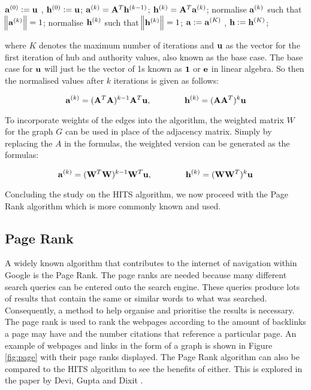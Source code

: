 \begin{algorithmic}
\State $\bold{a}^{(0)} := \bold{u}$ ,   $\bold{h}^{(0)} := \bold{u}$;
   		 \State \qquad $\bold{a}^{(k)} = \bold{A}^{T}\bold{h}^{(k-1)}$;
		 \State \qquad $\bold{h}^{(k)} = \bold{A}^{T}\bold{a}^{(k)}$;
		 \State \qquad normalise $\bold{a}^{(k)}$ such that $\norm{\bold{a}^{(k)}} = 1$;
		 \State \qquad normalise $\bold{h}^{(k)}$ such that $\norm{\bold{h}^{(k)}} = 1$;
\EndFor 
\State $\bold{a} := \bold{a}^{(K)}$ ,   $\bold{h} := \bold{h}^{(K)}$;
\newline
\end{algorithmic}

where $K$ denotes the maximum number of iterations and $\bold{u}$ as the vector for the first iteration of hub and authority values, also known as the base case. The base case for $\bold{u}$ will just be the vector of 1s known as $\bold{1}$ or $\bold{e}$ in linear algebra. So then the normalised values after $k$ iterations is given as follows:

\begin{equation} \label{eq:nhits}
\bold{a}^{(k)} = (\bold{A}^{T}\bold{A})^{k-1}\bold{A}^{T}\bold{u} , \qquad \qquad \bold{h}^{(k)} = (\bold{A}\bold{A}^{T})^{k}\bold{u}
\end{equation}

To incorporate weights of the edges into the algorithm, the weighted matrix $W$ for the graph $G$ can be used in place of the adjacency matrix. Simply by replacing the $A$ in the formulas, the weighted version can be generated as the formulas:

\begin{equation} \label{eq:nhits}
\bold{a}^{(k)} = (\bold{W}^{T}\bold{W})^{k-1}\bold{W}^{T}\bold{u} , \qquad \qquad \bold{h}^{(k)} = (\bold{W}\bold{W}^{T})^{k}\bold{u}
\end{equation}

Concluding the study on the HITS algorithm, we now proceed with the Page Rank algorithm which is more commonly known and used.

\subsection{Page Rank}
A widely known algorithm that contributes to the internet of navigation within Google is the Page Rank. The page ranks are needed because many different search queries can be entered onto the search engine. These queries produce lots of results that contain the same or similar words to what was searched. Consequently, a method to help organise and prioritise the results is necessary. The page rank is used to rank the webpages according to the amount of backlinks a page may have and the number citations that reference a particular page. An example of webpages and links in the form of a graph is shown in Figure \ref{fig:page} with their page ranks displayed. The Page Rank algorithm can also be compared to the HITS algorithm to see the benefits of either. This is explored in the paper by Devi, Gupta and Dixit \cite{devi2014comparative}.

